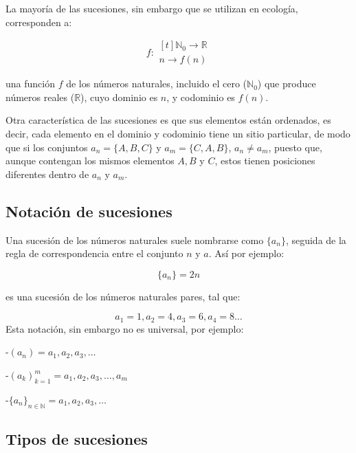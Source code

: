 \documentclass[
]{book}
\begin{document}
La mayoría de las sucesiones, sin embargo que se utilizan en ecología, corresponden a:

\begin{equation}
    f: 
    \begin{aligned}[t] 
            \mathbb{N}_0 \rightarrow \mathbb{R} \\
            n \rightarrow f(n)
    \end{aligned}
\end{equation}

una función \(f\) de los números naturales, incluido el cero (\(\mathbb{N}_0\)) que produce números reales (\(\mathbb{R}\)), cuyo dominio es \(n\), y codominio es \(f(n)\).

Otra característica de las sucesiones es que sus elementos están ordenados, es decir, cada elemento en el dominio y codominio tiene un sitio particular, de modo que si los conjuntos \(a_n = \{A, B, C\}\) y \(a_m = \{C, A, B\}\), \(a_n \neq a_m\), puesto que, aunque contengan los mismos elementos \(A, B\) y \(C\), estos tienen posiciones diferentes dentro de \(a_n\) y \(a_m\).

\hypertarget{notaciuxf3n-de-sucesiones}{%
\subsection{Notación de sucesiones}\label{notaciuxf3n-de-sucesiones}}

Una sucesión de los números naturales suele nombrarse como \(\{a_n\}\), seguida de la regla de correspondencia entre el conjunto \(n\) y \(a\). Así por ejemplo:

\begin{equation} 
    \{a_n\} = 2n \label{eq:a2n}
\end{equation}

es una sucesión de los números naturales pares, tal que:

\[a_1 = 1, a_2 = 4, a_3 = 6, a_4 = 8 \dots\]
Esta notación, sin embargo no es universal, por ejemplo:

-\((a_n) = a_1, a_2, a_3, \dots\)

-\((a_k)_{k=1}^m = a_1, a_2, a_3, \dots, a_m\)

-\(\{a_n\}_{n \in \mathbb{N}} = a_1, a_2, a_3, \dots\)

\hypertarget{tipos-de-sucesiones}{%
\subsection{Tipos de sucesiones}\label{tipos-de-sucesiones}}
\end{document}
